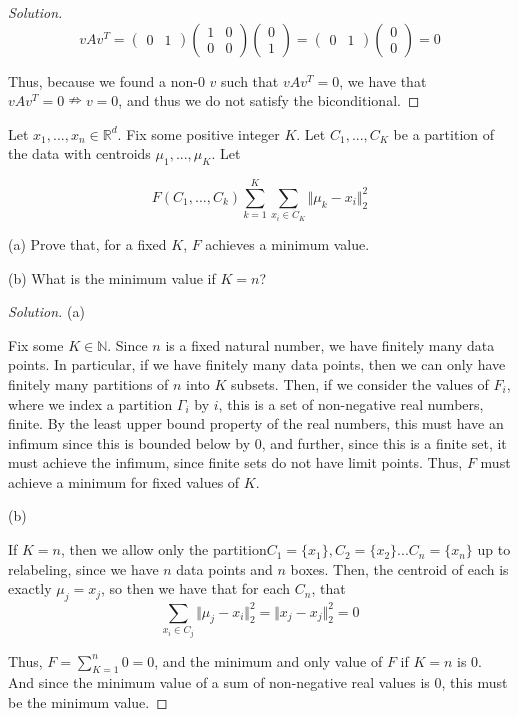 \documentclass[10pt]{article}
\newenvironment{problem}[2][]{\begin{trivlist}
\item[\hskip \labelsep {\bfseries #1}\hskip \labelsep {\bfseries #2.}]}{\end{trivlist}}
\begin{document}
\begin{proof}[Solution]
$$  v A v^T = \begin{pmatrix} 0 & 1 \end{pmatrix} \begin{pmatrix} 1 & 0 \\ 0 & 0 \end{pmatrix} \begin{pmatrix} 0 \\ 1\end{pmatrix} =   \begin{pmatrix} 0 & 1 \end{pmatrix}\begin{pmatrix} 0 \\ 0\end{pmatrix} = 0$$

Thus, because we found a non-0 $v$ such that $ v A v^T = 0$, we have that $v A v^T  = 0 \nRightarrow v = 0$, and thus we do not satisfy the biconditional.

\end{proof}

\begin{problem}{Question 4}

Let $x_1,...,x_n \in \mathbb{R}^d$. Fix some positive integer $K$. Let $C_1,...,C_K$ be a partition of the data with centroids $\mu_1,...,\mu_K$. Let

$$ F(C_1,...,C_k)  \sum_{k=1}^K \sum_{x_i \in C_K} \Vert \mu_k - x_i \Vert_2^2 $$

(a) Prove that, for a fixed $K$, $F$ achieves a minimum value.

(b) What is the minimum value if $K = n$?

\end{problem}

\begin{proof}[Solution]

(a)

Fix some $K \in \mathbb{N}$. Since $n$ is a fixed natural number, we have finitely many data points. In particular, if we have finitely many data points, then we can only have finitely many partitions of $n$ into $K$ subsets. Then, if we consider the values of $F_i$, where we index a partition $\Gamma_i$ by $i$, this is a set of non-negative real numbers, finite. By the least upper bound property of the real numbers, this must have an infimum since this is bounded below by $0$, and further, since this is a finite set, it must achieve the infimum, since finite sets do not have limit points. Thus, $F$ must achieve a minimum for fixed values of $K$.

(b)

If $K= n$, then we allow only the partition$C_1 = \{x_1\}, C_2 = \{ x_2 \} ... C_n = \{ x_n \}$ up to relabeling, since we have $n$ data points and $n$ boxes. Then, the centroid of each is exactly $\mu_j = x_j$, so then we have that for each $C_n$, that $$\sum_{x_i \in C_j  } \Vert \mu_j - x_i \Vert_2^2 = \Vert x_j - x_j \Vert_2^2 = 0$$ 

Thus, $F = \sum_{K=1}^n 0 = 0$, and the minimum and only value of $F$ if $K = n$ is $0$. And since the minimum value of a sum of non-negative real values is $0$, this must be the minimum value.


\end{proof}
\end{document}
